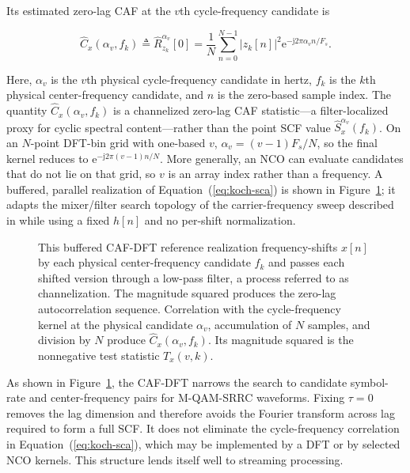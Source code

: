 Its estimated zero-lag CAF at the $v$th cycle-frequency candidate is

\begin{equation} \label{eq:koch-sca}
\widehat{C}_{x}(\alpha_v,f_k)
\triangleq \widehat{R}_{z_k}^{\alpha_v}[0]
= \frac{1}{N} \sum_{n=0}^{N-1}|z_k[n]|^{2}\mathrm{e}^{-\mathrm{j}2\pi \alpha_v n/F_s}.
\end{equation}

\noindent Here, $\alpha_v$ is the $v$th physical cycle-frequency candidate in hertz, $f_k$ is the $k$th physical center-frequency candidate, and $n$ is the zero-based sample index.  The quantity $\widehat{C}_{x}(\alpha_v,f_k)$ is a channelized zero-lag CAF statistic---a filter-localized proxy for cyclic spectral content---rather than the point SCF value $\widehat{S}_{x}^{\alpha_v}(f_k)$.  On an $N$-point DFT-bin grid with one-based $v$, $\alpha_v=(v-1)F_s/N$, so the final kernel reduces to $\mathrm{e}^{-\mathrm{j}2\pi(v-1)n/N}$.  More generally, an NCO can evaluate candidates that do not lie on that grid, so $v$ is an array index rather than a frequency.  A buffered, parallel realization of Equation~(\ref{eq:koch-sca}) is shown in Figure~\ref{fig:koch_sca}; it adapts the mixer/filter search topology of the carrier-frequency sweep described in \cite{koch-19} while using a fixed $h[n]$ and no per-shift normalization.

\begin{figure}[H]
\begin{center}
\resizebox{0.94\textwidth}{!}{}
\caption[Diagram of CAF-DFT SCA.]{This buffered CAF-DFT reference realization frequency-shifts $x[n]$ by each physical center-frequency candidate $f_k$ and passes each shifted version through a low-pass filter, a process referred to as channelization.  The magnitude squared produces the zero-lag autocorrelation sequence.  Correlation with the cycle-frequency kernel at the physical candidate $\alpha_v$, accumulation of $N$ samples, and division by $N$ produce $\widehat{C}_{x}(\alpha_v,f_k)$.  Its magnitude squared is the nonnegative test statistic $T_x(v,k)$.}
\label{fig:koch_sca}
\end{center}
\end{figure}

As shown in Figure~\ref{fig:koch_sca}, the CAF-DFT narrows the search to candidate symbol-rate and center-frequency pairs for M-QAM-SRRC waveforms.  Fixing $\tau=0$ removes the lag dimension and therefore avoids the Fourier transform across lag required to form a full SCF.  It does not eliminate the cycle-frequency correlation in Equation~(\ref{eq:koch-sca}), which may be implemented by a DFT or by selected NCO kernels.  This structure lends itself well to streaming processing.

